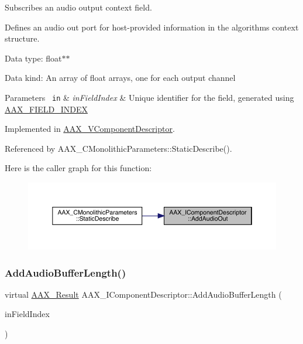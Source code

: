 Subscribes an audio output context field. 

Defines an audio out port for host-\/provided information in the algorithm\textquotesingle{}s context structure.


\begin{DoxyItemize}
\item Data type\+: float$\ast$$\ast$
\item Data kind\+: An array of float arrays, one for each output channel
\end{DoxyItemize}


\begin{DoxyParams}[1]{Parameters}
\mbox{\texttt{ in}}  & {\em in\+Field\+Index} & Unique identifier for the field, generated using \mbox{\hyperlink{a00392_acf807247ecd6e5899dc9dc31644e9a1d}{A\+A\+X\+\_\+\+F\+I\+E\+L\+D\+\_\+\+I\+N\+D\+EX}} \\
\hline
\end{DoxyParams}


Implemented in \mbox{\hyperlink{a01901_a08252ef7dc9aa763fcccfc527583c47f}{A\+A\+X\+\_\+\+V\+Component\+Descriptor}}.



Referenced by A\+A\+X\+\_\+\+C\+Monolithic\+Parameters\+::\+Static\+Describe().

Here is the caller graph for this function\+:
\nopagebreak
\begin{figure}[H]
\begin{center}
\leavevmode
\includegraphics[width=350pt]{a01781_afea50c52b3c2e68eef2857b75859a954_icgraph}
\end{center}
\end{figure}
\mbox{\label{a01781_a55d6cdb4a9c860c9ed4cb685e346f0dc}} 
\subsubsection{\texorpdfstring{AddAudioBufferLength()}{AddAudioBufferLength()}}
{\footnotesize\ttfamily virtual \mbox{\hyperlink{a00392_a4d8f69a697df7f70c3a8e9b8ee130d2f}{A\+A\+X\+\_\+\+Result}} A\+A\+X\+\_\+\+I\+Component\+Descriptor\+::\+Add\+Audio\+Buffer\+Length (\begin{DoxyParamCaption}\item[{\mbox{\hyperlink{a00392_ae807f8986143820cfb5d6da32165c9c7}{A\+A\+X\+\_\+\+C\+Field\+Index}}}]{in\+Field\+Index }\end{DoxyParamCaption})\hspace{0.3cm}{\ttfamily [pure virtual]}}



